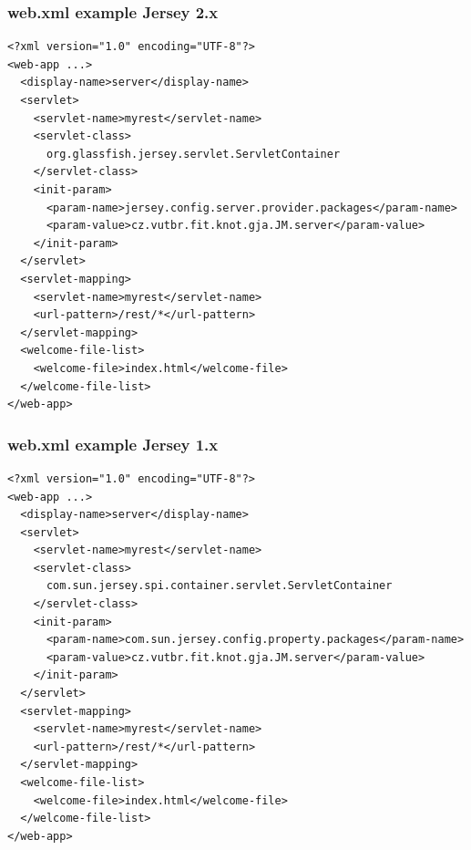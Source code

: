 \documentclass[10pt,xcolor=pdflatex]{beamer}
\begin{document}
\begin{frame}[containsverbatim]\frametitle{web.xml example Jersey 2.x}
\begin{footnotesize}
\begin{verbatim}
<?xml version="1.0" encoding="UTF-8"?>
<web-app ...>
  <display-name>server</display-name>
  <servlet>
    <servlet-name>myrest</servlet-name>
    <servlet-class>
      org.glassfish.jersey.servlet.ServletContainer
    </servlet-class>    
    <init-param>
      <param-name>jersey.config.server.provider.packages</param-name>
      <param-value>cz.vutbr.fit.knot.gja.JM.server</param-value>
    </init-param>
  </servlet>
  <servlet-mapping>
    <servlet-name>myrest</servlet-name>
    <url-pattern>/rest/*</url-pattern>
  </servlet-mapping>
  <welcome-file-list>
    <welcome-file>index.html</welcome-file>
  </welcome-file-list>
</web-app>
\end{verbatim}
\end{footnotesize}
\end{frame}


\begin{frame}[containsverbatim]\frametitle{web.xml example Jersey 1.x}
\begin{footnotesize}
\begin{verbatim}
<?xml version="1.0" encoding="UTF-8"?>
<web-app ...>
  <display-name>server</display-name>
  <servlet>
    <servlet-name>myrest</servlet-name>
    <servlet-class>
      com.sun.jersey.spi.container.servlet.ServletContainer
    </servlet-class>    
    <init-param>
      <param-name>com.sun.jersey.config.property.packages</param-name>
      <param-value>cz.vutbr.fit.knot.gja.JM.server</param-value>
    </init-param>
  </servlet>
  <servlet-mapping>
    <servlet-name>myrest</servlet-name>
    <url-pattern>/rest/*</url-pattern>
  </servlet-mapping>
  <welcome-file-list>
    <welcome-file>index.html</welcome-file>
  </welcome-file-list>
</web-app>
\end{verbatim}
\end{footnotesize}
\end{frame}
\end{document}
